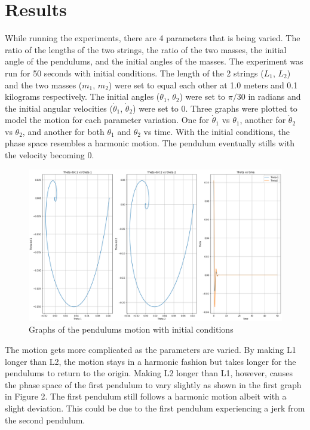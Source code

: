 \documentclass[linenumbers,RNAAS,trackchanges]{aastex631}
\begin{document}
\section{Results} \label{sec:results}
While running the experiments, there are 4 parameters that is being varied. The ratio of the lengths of the two strings, the ratio of the two masses, the initial angle of the pendulums, and the initial angles of the masses. The experiment was run for 50 seconds with initial conditions. The length of the 2 strings ($L_{1}$, $L_2$) and the two masses ($m_1$, $m_2$) were set to equal each other at 1.0 meters and 0.1 kilograms respectively. The initial angles ($\theta_1$, $\theta_2$) were set to $\pi/30$ in radians and the initial angular velocities ($\dot\theta_1$, $\dot\theta_2$) were set to 0. Three graphs were plotted to model the motion for each parameter variation. One for $\dot\theta_1$ vs $\theta_1$, another for $\dot\theta_2$ vs $\theta_2$, and another for both $\theta_1$ and $\theta_2$ vs time. With the initial conditions, the phase space resembles a harmonic motion. The pendulum eventually stills with the velocity becoming 0.
\begin{figure}[H]
    \centering
    \centering
    \includegraphics[scale=.30]{all.png}
    \caption{Graphs of the pendulums motion with initial conditions}
    \label{fig:code}
\end{figure}
The motion gets more complicated as the parameters are varied.
By making L1 longer than L2, the motion stays in a harmonic fashion but takes longer for the pendulums to return to the origin. Making L2 longer than L1, however, causes the phase space of the first pendulum to vary slightly as shown in the first graph in Figure 2. The first pendulum still follows a harmonic motion albeit with a slight deviation. This could be due to the first pendulum experiencing a jerk from the second pendulum.
\end{document}
